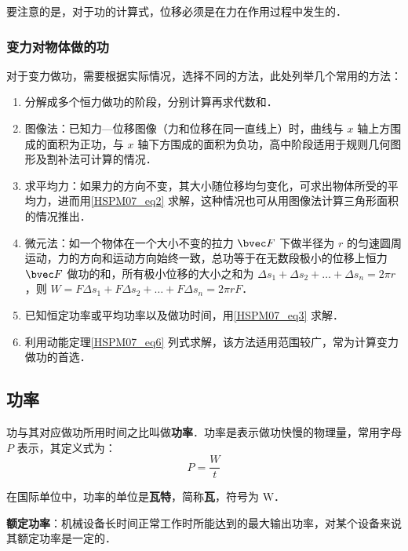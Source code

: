 要注意的是，对于功的计算式，位移必须是在力在作用过程中发生的．

\subsubsection{变力对物体做的功}

对于变力做功，需要根据实际情况，选择不同的方法，此处列举几个常用的方法：

\begin{enumerate}
\item 分解成多个恒力做功的阶段，分别计算再求代数和．

\item 图像法：已知力—位移图像（力和位移在同一直线上）时，曲线与 $x$ 轴上方围成的面积为正功，与 $x$ 轴下方围成的面积为负功，高中阶段适用于规则几何图形及割补法可计算的情况．

\item 求平均力：如果力的方向不变，其大小随位移均匀变化，可求出物体所受的平均力，进而用\autoref{HSPM07_eq2} 求解，这种情况也可从用图像法计算三角形面积的情况推出．

\item 微元法：如一个物体在一个大小不变的拉力 $\bvec F$ 下做半径为 $r$ 的匀速圆周运动，力的方向和运动方向始终一致，总功等于在无数段极小的位移上恒力 $\bvec F$ 做功的和，所有极小位移的大小之和为 $\Delta s_1+\Delta s_2+\dots+\Delta s_n=2\pi r$，则 $W=F\Delta s_1+F\Delta s_2+\dots+F\Delta s_n=2\pi rF$．

\item 已知恒定功率或平均功率以及做功时间，用\autoref{HSPM07_eq3} 求解．

\item 利用动能定理\autoref{HSPM07_eq6} 列式求解，该方法适用范围较广，常为计算变力做功的首选．
\end{enumerate}

\subsection{功率}

功与其对应做功所用时间之比叫做\textbf{功率}．功率是表示做功快慢的物理量，常用字母 $P$ 表示，其定义式为：
\begin{equation}\label{HSPM07_eq3}
P=\frac{W}{t}
\end{equation}

在国际单位中，功率的单位是\textbf{瓦特}，简称\textbf{瓦}，符号为 $\mathrm{W}$．

\textbf{额定功率}：机械设备长时间正常工作时所能达到的最大输出功率，对某个设备来说其额定功率是一定的．

